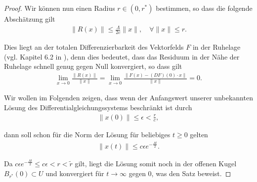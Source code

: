 \documentclass[letterpaper,10pt,english]{jupyterBook}
\begin{document}
\begin{proof}
\par
Wir können nun einen Radius \(r\in (0,{r^\ast})\) bestimmen, so dass die folgende Abschätzung gilt
\begin{align}\label{equation:odestability/ruhelagen:eq:residuum}
\|R(x)\| \leq \frac{\Lambda}{2c} \|x\|, \quad \forall \|x\| \leq r.
\end{align}
\par
Dies liegt an der totalen Differenzierbarkeit des Vektorfelds \(F\) in der Ruhelage (vgl. Kapitel 6.2 in \cite{Ten21}), denn dies bedeutet, dass das Residuum in der Nähe der Ruhelage schnell genug gegen Null konvergiert, so dass gilt
\begin{align*}
\lim_{x\to 0} \frac{\|R(x)\|}{\|x\|} = \lim_{x\to 0}\frac{\|F(x)- (DF)(0)\cdot x\|}{\|x\|} = 0.
\end{align*}
\par
Wir wollen im Folgenden zeigen, dass wenn der Anfangswert unserer unbekannten Lösung des Differentialgleichungssystems beschränkt ist durch
\begin{align*}
\|x(0)\| \leq \epsilon <\frac{r}{c},
\end{align*}
\par
dann soll schon für die Norm der Lösung für beliebiges \(t \geq 0\) gelten
\begin{align*}
\|x(t)\| \leq c\epsilon e^{-\frac{\Lambda t}{2}}.
\end{align*}
\par
Da \(c\epsilon e^{- \frac{\Lambda t}{2}} \leq c\epsilon < r <\tilde{r}\) gilt, liegt die Lösung somit noch in der offenen Kugel \(B_{{r^\ast}}(0) \subset U\) und konvergiert für \(t \rightarrow \infty\) gegen 0, was den Satz beweist.


\end{proof}
\end{document}
